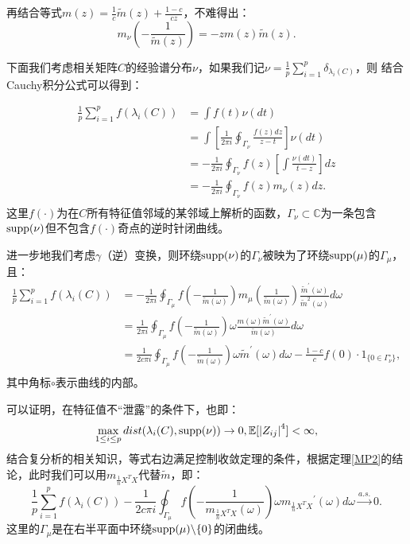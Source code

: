 \documentclass[UTF8,12pt]{ctexart}
\begin{document}
再结合等式$m(z) = \frac{1}{c}\tilde m(z) + \frac{1-c}{cz}$，不难得出：
\[
    m_\nu (-\frac{1}{\tilde m(z)}) = -zm(z) \tilde m(z).
\]  

下面我们考虑相关矩阵$C$的经验谱分布$\nu$，如果我们记$\nu = \frac{1}{p}\sum\limits_{i=1}^p \delta_{\lambda_i(C)}$，则
结合Cauchy积分公式可以得到：

\begin{equation*}
    \begin{aligned}
        \frac{1}{p}\sum\limits_{i=1}^p f(\lambda_i(C)) &
        = \int f(t) \nu(dt) \\
        & = \int[\frac{1}{2\pi i} \oint_{\Gamma_{\nu}} \frac{f(z)dz}{z-t}]\nu(dt)\\
        & = -\frac{1}{2\pi i} \oint_{\Gamma_{\nu}} f(z) [\int \frac{\nu(dt)}{t-z}]dz\\
        & = -\frac{1}{2\pi i} \oint_{\Gamma_{\nu}} f(z) m_\nu(z) dz.\\
    \end{aligned}
\end{equation*}  
这里$f(\cdot)$为在$C$所有特征值邻域的某邻域上解析的函数，$\Gamma_\nu \subset \mathbb C$为一条包含$\textup{supp}(\nu)$但不包含$f(\cdot)$奇点的逆时针闭曲线。

进一步地我们考虑$\gamma$（逆）变换，则环绕$\textup{supp}(\nu)$的$\Gamma_\nu$被映为了环绕$\textup{supp}(\mu)$的$\Gamma_\mu$，且：
\begin{equation*}
    \begin{aligned}
        \frac{1}{p}\sum\limits_{i=1}^p f(\lambda_i(C)) &
        = -\frac{1}{2\pi i} \oint_{\Gamma_\mu} f(-\frac{1}{\tilde m(\omega)})m_\mu(\frac{1}{\tilde m(\omega)})\frac{{\tilde m}^\prime(\omega)}{{\tilde m}^2(\omega)}d\omega \\
        & = \frac{1}{2\pi i} \oint_{\Gamma_\mu} f(-\frac{1}{\tilde m(\omega)}) \omega \frac{m(\omega){\tilde m}^\prime(\omega)}{\tilde m (\omega)}d\omega\\
        & = \frac{1}{2c\pi i} \oint_{\Gamma_\mu} f(-\frac{1}{\tilde m(\omega)}) \omega {\tilde m}^\prime(\omega) d\omega -\frac{1-c}{c} f(0) \cdot 1_{\{ 0 \in \Gamma_\nu^\circ \}}, \\
    \end{aligned}
\end{equation*}  
其中角标$\circ$表示曲线的内部。

可以证明，在特征值不“泄露”的条件下，也即：
\[
    \max\limits_{1 \leq i \leq p} dist(\lambda_i(C), \textup{supp}(\nu)) \rightarrow 0, \mathbb E [{|Z_{ij}|}^4] < \infty,
\]  
结合复分析的相关知识，等式右边满足控制收敛定理的条件，根据定理\ref{MP2}的结论，此时我们可以用$m_{\frac{1}{n}X^T X}$代替$\tilde m$，即：
\begin{equation}\label{si}
    \frac{1}{p}\sum\limits_{i=1}^p f(\lambda_i(C)) - \frac{1}{2c\pi i} \oint_{\Gamma_\mu} f(-\frac{1}{m_{\frac{1}{n}X^T X}(\omega)}) \omega {m_{\frac{1}{n}X^T X}}^\prime(\omega) d\omega \stackrel{a.s.}{\longrightarrow} 0.
\end{equation}
这里的$\Gamma_\mu$是在右半平面中环绕$\textup{supp}(\mu) \backslash \{0\}$的闭曲线。
\end{document}
